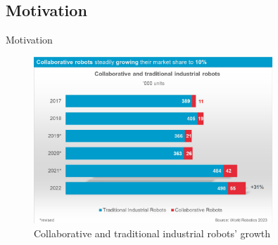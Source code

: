 \subsection{Motivation}
\begin{frame}{Motivation}
  \begin{figure}
    \centering
    \includegraphics[width=0.8\textwidth]{img/cobot_hist.png}
    \caption{Collaborative and traditional industrial robots' growth\footnotemark}
  \end{figure}
\end{frame}
